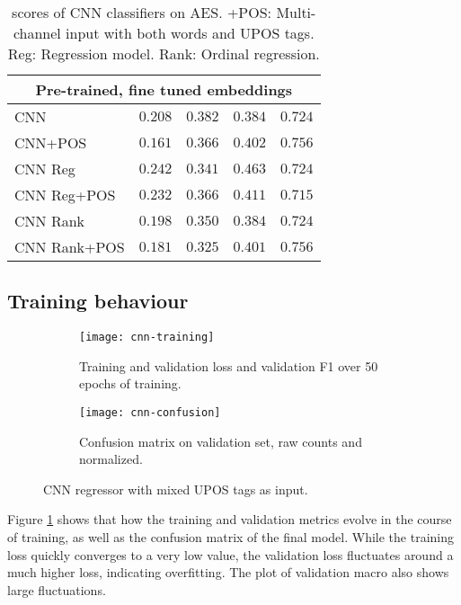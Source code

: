 \begin{table}
\begin{tabular}{lrrrr}
    \midrule
    \multicolumn{5}{c}{Pre-trained, fine tuned embeddings} \\
    \midrule
    CNN & $0.208$ & $0.382$ & $0.384$ & $0.724$ \\
    CNN+POS & $0.161$ & $0.366$ & $0.402$ & $\mathbf{0.756}$ \\
    CNN Reg & $0.242$ & $0.341$ & $\mathbf{0.463}$ & $0.724$ \\
    CNN Reg+POS & $0.232$ & $0.366$ & $0.411$ & $0.715$ \\
    CNN Rank & $0.198$ & $0.350$ & $0.384$ & $0.724$ \\
    CNN Rank+POS & $0.181$ & $0.325$ & $0.401$ & $\mathbf{0.756}$ \\
    \bottomrule
  \end{tabular}
  \caption[\FI scores of CNN classifiers on AES.]{
    \FI scores of CNN classifiers on AES. +POS: Multi-channel input with
    both words and UPOS tags. Reg: Regression model. Rank: Ordinal regression.
  }
  \label{tab:cnn-results}
\end{table}


\subsection{Training behaviour}

\begin{figure}
  \begin{subfigure}{\linewidth}
    \centering
    \texttt{[image: cnn-training]}
    \caption{Training and validation loss and validation F1 over 50 epochs of training.}
  \end{subfigure}
  \begin{subfigure}{\linewidth}
    \centering
    \texttt{[image: cnn-confusion]}
    \caption{Confusion matrix on validation set, raw counts and normalized.}
  \end{subfigure}
  \caption[Training behaviour of CNN regression]{
    CNN regressor with mixed UPOS tags as input.
  }
  \label{fig:cnn-training}
\end{figure}

Figure \ref{fig:cnn-training} shows that how the training and validation
metrics evolve in the course of training, as well as the confusion matrix of
the final model. While the training loss quickly converges to a very low
value, the validation loss fluctuates around a much higher loss, indicating
overfitting. The plot of validation macro \FI also shows large fluctuations.


